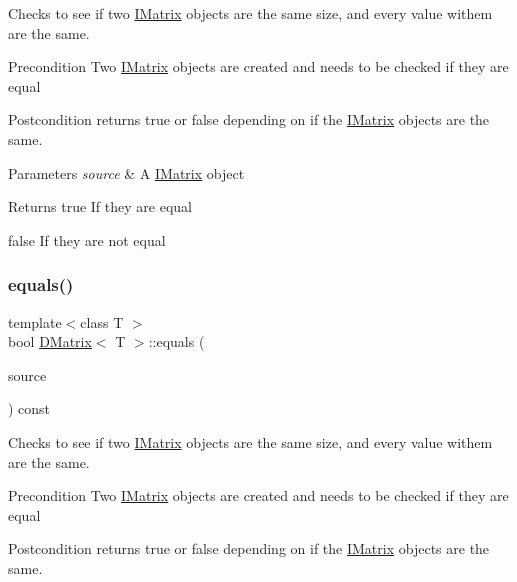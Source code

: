 Checks to see if two \mbox{\hyperlink{class_i_matrix}{I\+Matrix}} objects are the same size, and every value withem are the same. 

\begin{DoxyPrecond}{Precondition}
Two \mbox{\hyperlink{class_i_matrix}{I\+Matrix}} objects are created and needs to be checked if they are equal 
\end{DoxyPrecond}
\begin{DoxyPostcond}{Postcondition}
returns true or false depending on if the \mbox{\hyperlink{class_i_matrix}{I\+Matrix}} objects are the same.
\end{DoxyPostcond}

\begin{DoxyParams}{Parameters}
{\em source} & A \mbox{\hyperlink{class_i_matrix}{I\+Matrix}} object \\
\hline
\end{DoxyParams}
\begin{DoxyReturn}{Returns}
true If they are equal 

false If they are not equal 
\end{DoxyReturn}
\mbox{\label{class_d_matrix_a8a8826ba4911a6a8ec3c0fe2f2d494df}} 
\subsubsection{\texorpdfstring{equals()}{equals()}\hspace{0.1cm}{\footnotesize\ttfamily [6/6]}}
{\footnotesize\ttfamily template$<$class T $>$ \\
bool \mbox{\hyperlink{class_d_matrix}{D\+Matrix}}$<$ T $>$\+::equals (\begin{DoxyParamCaption}\item[{const \mbox{\hyperlink{class_i_matrix}{I\+Matrix}}$<$ \mbox{\hyperlink{class_d_matrix}{D\+Matrix}}$<$ T $>$, T $>$ \&}]{source }\end{DoxyParamCaption}) const\hspace{0.3cm}{\ttfamily [virtual]}}



Checks to see if two \mbox{\hyperlink{class_i_matrix}{I\+Matrix}} objects are the same size, and every value withem are the same. 

\begin{DoxyPrecond}{Precondition}
Two \mbox{\hyperlink{class_i_matrix}{I\+Matrix}} objects are created and needs to be checked if they are equal 
\end{DoxyPrecond}
\begin{DoxyPostcond}{Postcondition}
returns true or false depending on if the \mbox{\hyperlink{class_i_matrix}{I\+Matrix}} objects are the same.
\end{DoxyPostcond}

